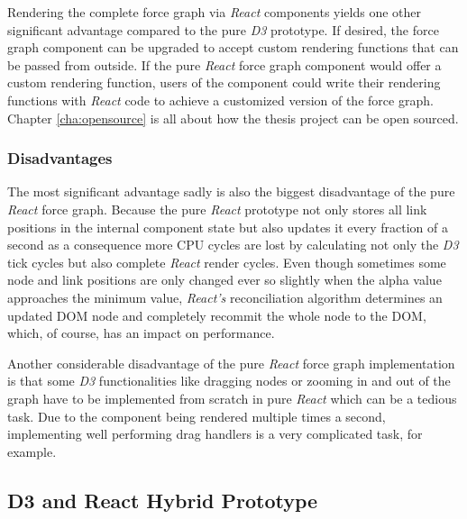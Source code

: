 Rendering the complete force graph via \emph{React} components yields one other significant advantage compared to the pure \emph{D3} prototype. If desired, the force graph component can be upgraded to accept custom rendering functions that can be passed from outside. If the pure \emph{React} force graph component would offer a custom rendering function, users of the component could write their rendering functions with \emph{React} code to achieve a customized version of the force graph. Chapter \ref{cha:opensource} is all about how the thesis project can be open sourced.

\subsubsection{Disadvantages}

The most significant advantage sadly is also the biggest disadvantage of the pure \emph{React} force graph. Because the pure \emph{React} prototype not only stores all link positions in the internal component state but also updates it every fraction of a second as a consequence more CPU cycles are lost by calculating not only the \emph{D3} tick cycles but also complete \emph{React} render cycles. Even though sometimes some node and link positions are only changed ever so slightly when the alpha value approaches the minimum value, \emph{React's} reconciliation algorithm determines an updated DOM node and completely recommit the whole node to the DOM, which, of course, has an impact on performance.

Another considerable disadvantage of the pure \emph{React} force graph implementation is that some \emph{D3} functionalities like dragging nodes or zooming in and out of the graph have to be implemented from scratch in pure \emph{React} which can be a tedious task. Due to the component being rendered multiple times a second, implementing well performing drag handlers is a very complicated task, for example.


\subsection{D3 and React Hybrid Prototype}
\label{sub:D3AndReactHybrid}

